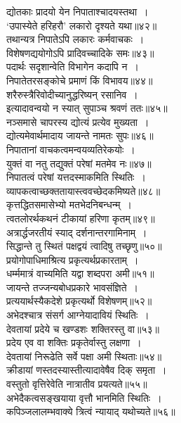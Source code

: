 {{{{\begin{center}
 द्योतकाः प्रादयो येन निपाताश्चादयस्तथा~।\\
 `उपास्येते हरिहरौ' लकारो दृश्यते यथा॥४२॥\\[10pt]
 तथान्यत्र निपातेऽपि लकारः कर्मवाचकः~।\\
 विशेषणद्ययोगोऽपि प्रादिवच्चादिके समः॥४३॥\\[10pt]
 पदार्थः सदृशान्वेति विभागेन कदापि न~।\\
 निपातेतरसङ्कोचे प्रमाणं किं विभावय॥४४॥\\[10pt]
 शरैरुस्त्रैरिवोदीच्यानुद्धरिष्यन् रसानिव~।\\
 इत्यादावन्वयो न स्यात् सुपाञ्च श्रवणं ततः॥४५॥\\[10pt]
 नञ्समासे चापरस्य द्योत्यं प्रत्येव मुख्यता~।\\
 द्योत्यमेवार्थमादाय जायन्ते नामतः सुपः॥४६॥\\[10pt]
 निपातानां वाचकत्वमन्वयव्यतिरेकयोः~।\\
 युक्तं वा नतु तद्युक्तं परेषां मतमेव नः॥४७॥\\[10pt]
 निपातत्वं परेषां यत्तदस्माकमिति स्थितिः~।\\
 व्यापकत्वाच्छक्ततायास्त्ववच्छेदकमिष्यते॥४८॥\\[10pt]
 कृत्तद्धितसमासेभ्यो मतभेदनिबन्धन्म्~।\\
 त्वतलोरर्थकथनं टीकायां हरिणा कृतम्॥४९॥\\[10pt]
 अत्रार्द्धजरतीयं स्याद् दर्शनान्तरगामिनाम्~।\\
 सिद्धान्ते तु स्थितं पक्षद्वयं त्वादिषु तच्छृणु॥५०॥\\[10pt]
 प्रयोगोपाधिमाश्रित्य प्रकृत्यर्थप्रकारताम्~।\\
 धर्म्ममात्रं वाच्यमिति यद्वा शब्दपरा अमी॥५१॥\\[10pt]
 जायन्ते तज्जन्यबोधप्रकारे भावसंज्ञिते~।\\
 प्रत्ययार्थस्यैकदेशे प्रकृत्यर्थो विशेषणम्॥५२॥\\[10pt]
 अभेदश्चात्र संसर्ग आग्नेयादावियं स्थितिः~।\\
 देवतायां प्रदेये च खण्डशः शक्तिरस्तु वा॥५३॥\\[10pt]
 प्रदेय एव वा शक्तिः प्रकृतेर्वास्तु लक्षणा~।\\
 देवतायां निरूढेति सर्वे पक्षा अमी स्थिताः॥५४॥\\[10pt]
 क्रीडायां णस्तदस्यास्तीत्यादावेषैव दिक् समृता~।\\
 वस्तुतो वृत्तिरेवेति नात्रातीव प्रयत्यते॥५५॥\\[10pt]
 अभेदैकत्वसङ्खयाया वृत्तौ भानमिति स्थितिः~।\\
 कपिञ्जलालम्भवाक्ये त्रित्वं न्यायाद् यथोच्यते॥५६॥\\[10pt]

\end{center}}}}}
